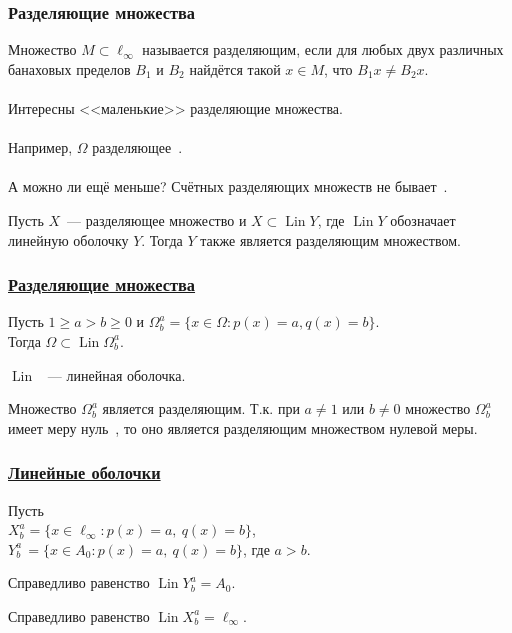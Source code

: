 \begin{frame}\frametitle{Разделяющие множества}
	\label{page:p_q_linhulls}
	Множество $M\subset \ell_\infty$ называется разделяющим,
	если для любых двух различных банаховых пределов $B_1$ и $B_2$
	найдётся такой $x\in M$, что $B_1 x \ne B_2 x$.
	\\~\\
	Интересны <<маленькие>> разделяющие множества.
	\\~\\
	Например, $\Omega$ разделяющее~\cite{semenov2010characteristic}.
	\\~\\
	А можно ли ещё меньше?
	\vfill
	Счётных разделяющих множеств не бывает~\cite{Semenov2014geomprops}.
	\vfill
	\begin{llemma}
		Пусть $X$~--- разделяющее множество и $X \subset \operatorname{Lin} Y$,
		где $\operatorname{Lin} Y$ обозначает линейную оболочку $Y$.
		Тогда $Y$ также является разделяющим множеством.
	\end{llemma}
\end{frame}


\begin{frame}\frametitle{\underline{Разделяющие множества}}

	\begin{ttheorem}
		Пусть
		$1 \geq a > b \geq 0$ и
		$\Omega^a_b = \{x\in\Omega : p(x) = a, q(x) = b\}$.
		\\
		Тогда $\Omega \subset \operatorname{Lin} \Omega^a_b$.
	\end{ttheorem}

	\vfill
	$\operatorname{Lin}$ ~--- линейная оболочка.
	\vfill
	\begin{ttheorem}
		Множество $\Omega^a_b$ является разделяющим.
		Т.к. при $a\neq 1$ или $b\neq 0$ множество $\Omega^a_b$ имеет меру нуль~\cite{semenov2010characteristic,connor1990almost},
		то оно является разделяющим множеством нулевой меры.
	\end{ttheorem}
\end{frame}


\begin{frame}\frametitle{\underline{Линейные оболочки}}

	Пусть
	\\
	$X^a_b = \{x\in\ell_\infty : p(x) = a,~ q(x) = b\}$,
	\\
	$Y^a_b\, = \{x\in A_0 : p(x) = a,~ q(x) = b\}$, где $a>b$.
	\vfill
	\begin{ttheorem}
		Справедливо равенство $\operatorname{Lin} Y^a_b = A_0$.
	\end{ttheorem}
	\vfill
	\begin{ttheorem}
		Справедливо равенство $\operatorname{Lin} X^a_b = \ell_\infty$.
	\end{ttheorem}

\end{frame}



